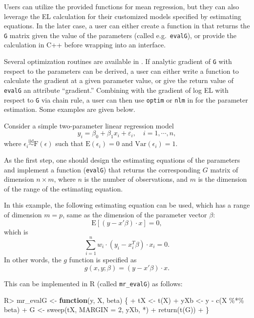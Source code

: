 \documentclass[article]{jss}
\newenvironment{Shaded}{\begin{snugshade}}{\end{snugshade}}
\newcommand{\AttributeTok}[1]{\textcolor[rgb]{0.77,0.63,0.00}{#1}}
\newcommand{\ControlFlowTok}[1]{\textcolor[rgb]{0.13,0.29,0.53}{\textbf{#1}}}
\newcommand{\DecValTok}[1]{\textcolor[rgb]{0.00,0.00,0.81}{#1}}
\newcommand{\FunctionTok}[1]{\textcolor[rgb]{0.00,0.00,0.00}{#1}}
\newcommand{\NormalTok}[1]{#1}
\newcommand{\OtherTok}[1]{\textcolor[rgb]{0.56,0.35,0.01}{#1}}
\newcommand{\SpecialCharTok}[1]{\textcolor[rgb]{0.00,0.00,0.00}{#1}}
\newcommand{\StringTok}[1]{\textcolor[rgb]{0.31,0.60,0.02}{#1}}
\renewcommand{\|}{\,|\,}
\begin{document}
Users can utilize the provided functions for mean regression, but they can also leverage the EL calculation for their customized models specified by estimating equations. In the later case, a user can either create a function in  that returns the \texttt{G} matrix given the value of the parameters (called e.g.~\texttt{evalG}), or provide the calculation in C++ before wrapping into an  interface.

Several optimization routines are available in . If analytic gradient of \texttt{G} with respect to the parameters can be derived, a user can either write a function to calculate the gradient at a given parameter value, or give the return value of \texttt{evalG} an attribute ``gradient.'' Combining with the gradient of log EL with respect to \texttt{G} via chain rule, a user can then use \texttt{optim} or \texttt{nlm} in  for the parameter estimation. Some examples are given below.

Consider a simple two-parameter linear regression model
\[
  y_i = \beta_0 + \beta_1x_i + \varepsilon_i, \quad i=1,\cdots,n,
\]
where \(\epsilon_i \stackrel {\textrm{iid}}{\sim}\text{F}(\epsilon)\) such that \(\textrm{E}(\epsilon_i) = 0\) and \(\text{Var}(\epsilon_i) = 1\).

As the first step, one should design the estimating equations of the parameters and implement a function (\texttt{evalG}) that returns the corresponding \(G\) matrix of dimension \(n\times m\), where \(n\) is the number of observations, and \(m\) is the dimension of the range of the estimating equation.

In this example, the following estimating equation can be used, which has a range of dimension \(m=p\), same as the dimension of the parameter vector \(\beta\):
\[
  \textrm{E}[(y-x'\beta)\cdot x] = 0,
\]
which is
\[
  \sum_{i=1}^n w_i\cdot (y_i-x_i^T\beta)\cdot x_i = 0.
\]
In other words, the \(g\) function is specified as
\[
  g(x,y;\beta) = (y-x'\beta)\cdot x.
\]

This can be implemented in R (called \texttt{mr\_evalG}) as follows:

\begin{Shaded}
\begin{Highlighting}[]
\NormalTok{R}\SpecialCharTok{\textgreater{}}\NormalTok{ mr\_evalG }\OtherTok{\textless{}{-}} \ControlFlowTok{function}\NormalTok{(y, X, beta) \{}
\SpecialCharTok{+}\NormalTok{    tX }\OtherTok{\textless{}{-}} \FunctionTok{t}\NormalTok{(X)}
\SpecialCharTok{+}\NormalTok{    yXb }\OtherTok{\textless{}{-}}\NormalTok{ y }\SpecialCharTok{{-}} \FunctionTok{c}\NormalTok{(X }\SpecialCharTok{\%*\%}\NormalTok{ beta)}
\SpecialCharTok{+}\NormalTok{    G }\OtherTok{\textless{}{-}} \FunctionTok{sweep}\NormalTok{(tX, }\AttributeTok{MARGIN =} \DecValTok{2}\NormalTok{, yXb, }\StringTok{\textasciigrave{}}\AttributeTok{*}\StringTok{\textasciigrave{}}\NormalTok{)}
\SpecialCharTok{+}    \FunctionTok{return}\NormalTok{(}\FunctionTok{t}\NormalTok{(G))}
\SpecialCharTok{+}\NormalTok{  \}}
\end{Highlighting}
\end{Shaded}
\end{document}
